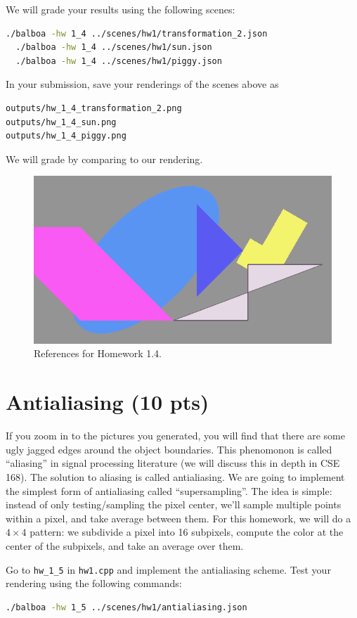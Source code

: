 We will grade your results using the following scenes:
\begin{lstlisting}[language=bash]
  ./balboa -hw 1_4 ../scenes/hw1/transformation_2.json
  ./balboa -hw 1_4 ../scenes/hw1/sun.json
  ./balboa -hw 1_4 ../scenes/hw1/piggy.json
\end{lstlisting}
In your submission, save your renderings of the scenes above as
\begin{lstlisting}[language=bash]
outputs/hw_1_4_transformation_2.png
outputs/hw_1_4_sun.png
outputs/hw_1_4_piggy.png
\end{lstlisting}
We will grade by comparing to our rendering.

\begin{figure}[ht]
    \centering
    \includegraphics[width=0.5\linewidth]{imgs/hw_1_4.png}
    \caption{References for Homework 1.4.}
    \label{fig:hw1_4}
\end{figure}

\section{Antialiasing (10 pts)}
If you zoom in to the pictures you generated, you will find that there are some ugly jagged edges around the object boundaries. This phenomonon is called ``aliasing'' in signal processing literature (we will discuss this in depth in CSE 168). The solution to aliasing is called antialiasing. We are going to implement the simplest form of antialiasing called ``supersampling''. The idea is simple: instead of only testing/sampling the pixel center, we'll sample multiple points within a pixel, and take average between them. For this homework, we will do a $4\times4$ pattern: we subdivide a pixel into 16 subpixels, compute the color at the center of the subpixels, and take an average over them.


Go to \lstinline{hw_1_5} in \lstinline{hw1.cpp} and implement the antialiasing scheme. Test your rendering using the following commands:
\begin{lstlisting}[language=bash]
  ./balboa -hw 1_5 ../scenes/hw1/antialiasing.json
\end{lstlisting}

